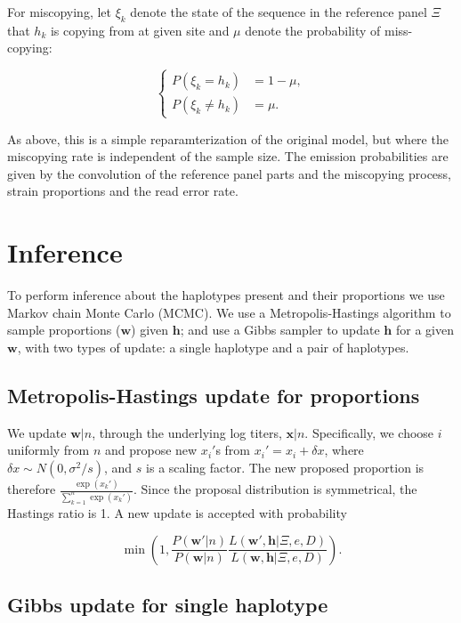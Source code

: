 \documentclass{nature}
\begin{document}
For miscopying, let $\xi_k$ denote the state of the sequence in the reference panel $\Xi$ that $h_k$ is copying from at given site and $\mu$ denote the probability of miss-copying:

$$
\begin{cases}
P(\xi_k = h_k) &= 1-\mu, \\
P(\xi_k \neq h_k) &= \mu.
\end{cases}
$$

\noindent As above, this is a simple reparamterization of the original model, but where the miscopying rate is independent of the sample size. The emission probabilities are given by the convolution of the reference panel parts and the miscopying process, strain proportions and the read error rate.




\section*{Inference}

To perform inference about the haplotypes present and their proportions we use Markov chain Monte Carlo (MCMC). We use a Metropolis-Hastings algorithm to sample proportions ($\mathbf w$) given $\mathbf h$; and use a Gibbs sampler to update $\mathbf h$ for a given $\mathbf w$, with two types of update: a single haplotype and a pair of haplotypes.


\subsection*{Metropolis-Hastings update for proportions}\label{sec:updateP}

We update $\mathbf{w}|n$, through the underlying log titers, $\mathbf{x}|n$. Specifically, we choose $i$ uniformly from $n$ and propose new $x_i'$s from $x_i' = x_i + \delta x$, where $\delta x \sim N(0, \sigma^2/s)$, and $s$ is a scaling factor. The new proposed proportion is therefore $\frac{\exp(x_k')}{\sum_{k=1}^n \exp(x_k')}$. Since the proposal distribution is symmetrical, the Hastings ratio is 1. A new update is accepted with probability

 $$\min\left(1, \frac{P(\mathbf{w}'|n)}{P(\mathbf{w}|n)} \frac{L(\mathbf{w}', \mathbf{h} | \Xi, e, D)}{L(\mathbf{w}, \mathbf{h} | \Xi, e, D)}\right).$$



\subsection*{Gibbs update for single haplotype}
\end{document}
